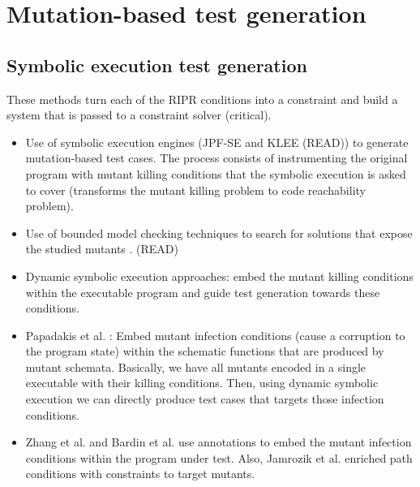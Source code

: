 
\section{Mutation-based test generation}

\subsection{Symbolic execution test generation} %
\label{sub:static_constraint_based_test_generation}

These methods turn each of the RIPR conditions into a constraint and build a system that is passed to a constraint solver (critical).

\begin{itemize}
	\item Use of symbolic execution engines (JPF-SE \cite{anand2007jpf} and KLEE \cite{holling2016nequivack} (READ)) to generate mutation-based test cases. 
	The process consists of instrumenting the original program with mutant killing conditions that the symbolic execution is asked to cover (transforms the mutant killing problem to code reachability problem). 
	\item Use of bounded model checking techniques to search for solutions that expose the studied mutants \cite{riener2011test}. (READ)

	\item Dynamic symbolic execution approaches: embed the mutant killing conditions within the executable program and guide test generation towards these conditions.

	\item Papadakis et al. \cite{papadakis2011automatically, papadakis2010towards}:
	Embed mutant infection conditions (cause a corruption to the program state) within the schematic functions that are produced by mutant schemata. Basically, we have all mutants encoded in a single executable with their killing conditions. Then, using dynamic symbolic execution we can directly produce test cases that targets those infection conditions.

	\item Zhang et al. \cite{zhang2010test} and Bardin et al. \cite{papadakis2011automatically,papadakis2010towards} use annotations to embed the mutant infection conditions within the program under test. Also, Jamrozik et al. \cite{jamrozik2013generating} enriched path conditions with constraints to target mutants.


\end{itemize}
